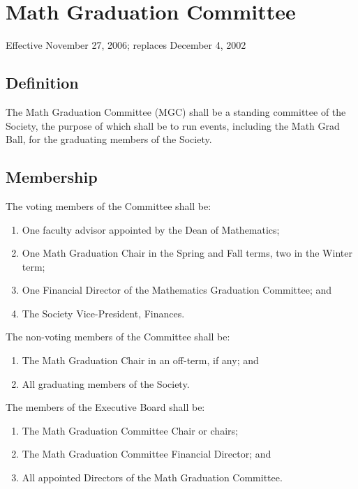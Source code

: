 \section{Math Graduation Committee}
Effective November 27, 2006; replaces December 4, 2002

\subsection{Definition}
The Math Graduation Committee (MGC) shall be a standing committee of the Society, the purpose of which shall be to run events, including the Math Grad Ball, for the graduating members of the Society.

\subsection{Membership}
The voting members of the Committee shall be:
\begin{enumerate}
\item One faculty advisor appointed by the Dean of Mathematics;
\item One Math Graduation Chair in the Spring and Fall terms, two in the Winter term;
\item One Financial Director of the Mathematics Graduation Committee; and
\item The Society Vice-President, Finances.
\end{enumerate}
The non-voting members of the Committee shall be:
\begin{enumerate}
\item The Math Graduation Chair in an off-term, if any; and
\item All graduating members of the Society.
\end{enumerate}
The members of the Executive Board shall be:
\begin{enumerate}
\item The Math Graduation Committee Chair or chairs;
\item The Math Graduation Committee Financial Director; and
\item All appointed Directors of the Math Graduation Committee.
\end{enumerate}

